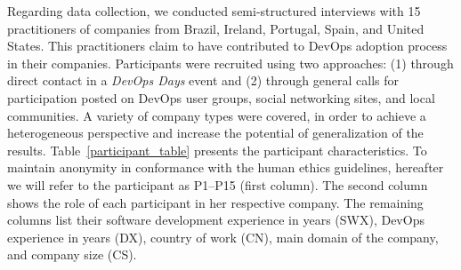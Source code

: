 
Regarding data collection, we conducted semi-structured interviews with 15 practitioners of companies from
Brazil, Ireland, Portugal, Spain, and United States. This practitioners claim
to have contributed to DevOps adoption process in their companies. Participants
were recruited using two approaches: (1) through direct contact in a \emph{DevOps Days} 
event and (2) through  general
calls for participation posted on DevOps user groups, social networking sites,
and local communities. A variety of company types were covered, in order to
achieve a heterogeneous perspective and increase the potential of generalization
of the results. Table~\ref{participant_table} presents the participant
characteristics. 
To maintain anonymity in conformance with the human ethics guidelines,
hereafter we will refer to the participant as P1--P15 (first column).
The second column shows the role of
each participant in her respective company. The remaining columns list their
software development experience in years (SWX), DevOps experience in years (DX),
country of work (CN), main domain of the company, and company size (CS).


